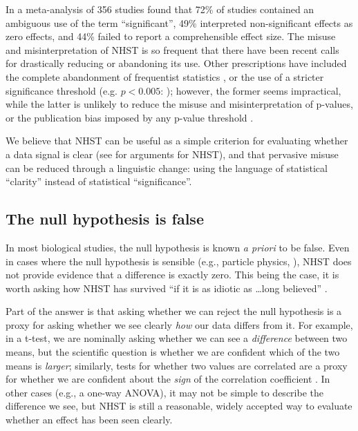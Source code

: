 \documentclass[12pt, english, dvipsnames, table]{article} %
\newcommand{\pval}{p-value\xspace}
\newcommand{\pvals}{p-values\xspace}
\begin{document}
In a meta-analysis of 356 studies \citet{Bernardietal.2017} found that 72\% of studies contained an ambiguous use of the term ``significant'', 49\% interpreted non-significant effects as zero effects, and 44\% failed to report a comprehensible effect size. The misuse and misinterpretation of NHST is so frequent that there have been recent calls for drastically reducing \citep{SzucsandIoannidis2017} or abandoning \citep{McShaneetal.2017} its use. Other prescriptions have included the complete abandonment of frequentist statistics \citep{The2011}, or the use of a stricter significance threshold (e.g. $p < 0.005$: \cite{Benjaminetal.2018}); however, the former seems impractical, while the latter is unlikely to reduce the misuse and misinterpretation of \pvals, or the publication bias imposed by any \pval threshold \citep{Ridleyetal.2007}.

We believe that NHST can be useful as a simple criterion for evaluating whether a data signal is clear  (see \cite{Abelson1997} for arguments for NHST), and that pervasive misuse can be reduced through a linguistic change: using the language of statistical ``clarity'' instead of statistical ``significance''.

\subsection*{The null hypothesis is false}

\noindent In most biological studies, the null hypothesis is known \emph{a priori} to be false. Even in cases where the null hypothesis is sensible (e.g., particle physics, \cite{Staley2017}), NHST does not provide evidence that a difference is exactly zero. This being the case, it is worth asking how NHST has survived ``if it is as idiotic as \ldots long believed'' \citet[cited in \cite{Kramer2011}]{ZiliakandMcCloskey2008}.

Part of the answer is that asking whether we can reject the null hypothesis is a proxy for asking whether we see clearly \emph{how} our data differs from it. For example, in a t-test, we are nominally asking whether we can see a \emph{difference} between two means, but the scientific question is whether we are confident which of the two means is \emph{larger}; similarly, tests for whether two values are correlated are a proxy for whether we are confident about the \emph{sign} of the correlation coefficient \citep{robinson2001past}. In other cases (e.g., a one-way ANOVA), it may not be simple to describe the difference we see, but NHST is still a reasonable, widely accepted way to evaluate whether an effect has been seen clearly.
\end{document}
